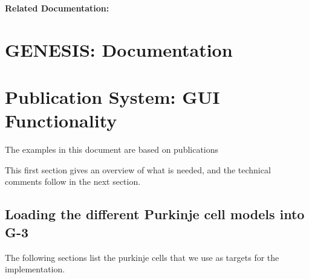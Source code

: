 \documentclass[12pt]{article}
\begin{document}
{\bf Related Documentation:}

\section*{GENESIS: Documentation}

\section{Publication System: GUI Functionality}






The examples in this document are based on publications
\cite{deschutter94:_purkin_i}\cite{deschutter94:_purkin_ii}\cite{schutter94:_simul_purkin}\cite{Rapp-P:1994qf}

This first section gives an overview of what is needed, and the
technical comments follow in the next section.

\subsection{Loading the different Purkinje cell models into G-3}

The following sections list the purkinje cells that we use as targets
for the implementation.
\end{document}
